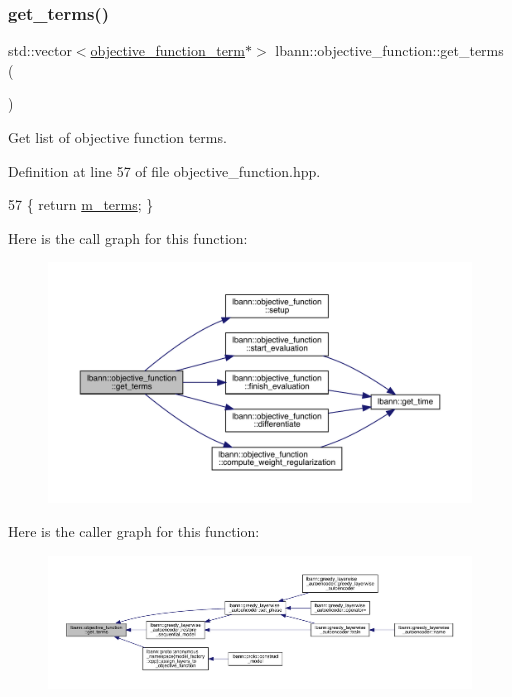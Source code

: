 \subsubsection{\texorpdfstring{get\+\_\+terms()}{get\_terms()}}
{\footnotesize\ttfamily std\+::vector$<$\hyperlink{classlbann_1_1objective__function__term}{objective\+\_\+function\+\_\+term}$\ast$$>$ lbann\+::objective\+\_\+function\+::get\+\_\+terms (\begin{DoxyParamCaption}{ }\end{DoxyParamCaption})\hspace{0.3cm}{\ttfamily [inline]}}

Get list of objective function terms. 

Definition at line 57 of file objective\+\_\+function.\+hpp.


\begin{DoxyCode}
57 \{ \textcolor{keywordflow}{return} \hyperlink{classlbann_1_1objective__function_aea9c1f90ba9af1b1330efa2ba6adb5e2}{m\_terms}; \}
\end{DoxyCode}
Here is the call graph for this function\+:\nopagebreak
\begin{figure}[H]
\begin{center}
\leavevmode
\includegraphics[width=350pt]{classlbann_1_1objective__function_a510544e9e511be54a50efd39226de345_cgraph}
\end{center}
\end{figure}
Here is the caller graph for this function\+:\nopagebreak
\begin{figure}[H]
\begin{center}
\leavevmode
\includegraphics[width=350pt]{classlbann_1_1objective__function_a510544e9e511be54a50efd39226de345_icgraph}
\end{center}
\end{figure}
